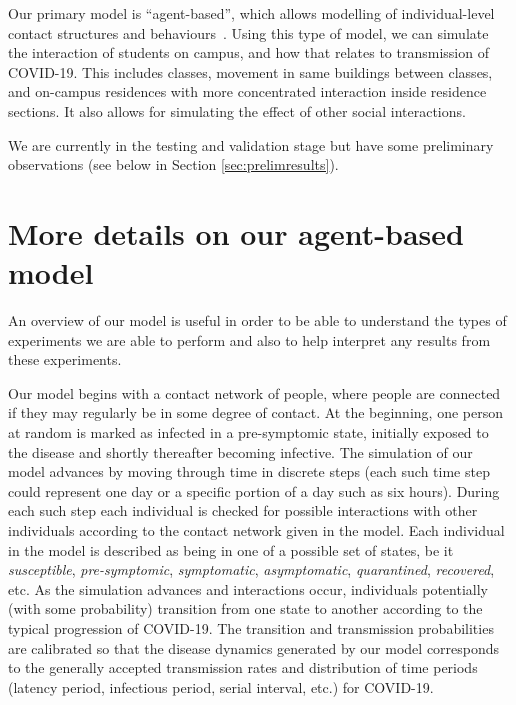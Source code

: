 \documentclass[fleqn,10pt]{SelfArx} %
\newcommand{\ed}[1]{{\color{blue} #1}}
\begin{document}
Our primary model is ``agent-based'', which allows modelling of individual-level contact structures and behaviours~\cite{luke_systems_2012,el-sayed_social_2012}.  Using this type of model, we can simulate the interaction of students on campus, and how that relates to transmission of COVID-19.
This includes classes, movement in same buildings between classes, and on-campus residences with more concentrated interaction inside residence sections.  It also allows for simulating the effect of other social interactions.


We are currently in the testing and validation stage but have some preliminary observations (see below in Section \ref{sec:prelimresults}).



\section{More details on our agent-based model}
An overview of our model is useful in order to be able to understand the types of experiments we are able to perform and also to help interpret any results from these experiments.

Our model begins with a contact network of people, where people are connected if they may regularly be in some degree of contact.  At the beginning, one person at random is marked as infected in a pre-symptomic state, initially exposed to the disease and shortly thereafter becoming infective.  
The simulation of our model advances by moving through time in discrete steps (each such time step could represent one day or a specific portion of a day such as six hours).
During each such step each individual is checked for possible interactions with other individuals according to the contact network given in the model.
Each individual in the model is described as being in one of a possible set of states, be it \emph{susceptible}, \emph{pre-symptomic}, \emph{symptomatic}, \emph{asymptomatic}, \emph{quarantined}, \emph{recovered}, etc.  As the simulation advances and interactions occur, individuals potentially (with some probability) transition from one state to another according to the typical progression of COVID-19.
The transition and transmission probabilities are calibrated so that the disease dynamics generated by our model corresponds to the generally accepted transmission rates and distribution of time periods (latency period, infectious period, serial interval, etc.) for COVID-19.
\end{document}
